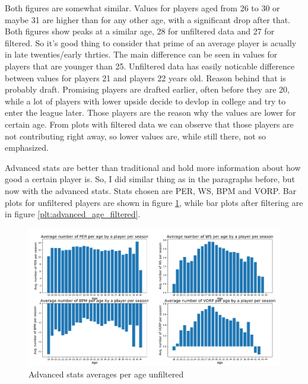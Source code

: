\documentclass[a4paper]{article}
\begin{document}
Both figures are somewhat similar. Values for players aged from 26 to 30 or maybe 31 are higher than for any other age, with a significant drop after that. Both figures show peaks at a similar age, 28 for unfiltered data and 27 for filtered. So it's good thing to consider that prime of an average player is acually in late twenties/early thrties. The main difference can be seen in values for players that are younger than 25. Unfiltered data has easily noticable difference between values for players 21 and players 22 years old. Reason behind that is probably draft. Promising players are drafted earlier, often before they are 20, while a lot of players with lower upside decide to devlop in college and try to enter the league later. Those players are the reason why the values are lower for certain age. From plots with filtered data we can observe that those players are not contributing right away, so lower values are, while still there, not so emphasized.

Advanced stats are better than traditional and hold more information about how good a certain player is. So, I did similar thing as in the paragraphs before, but now with the advanced stats. Stats chosen are PER, WS, BPM and VORP. Bar plots for unfiltered players are shown in figure \ref{plt:advanced_age}, while bar plots after filtering are in figure \ref{plt:advanced_age_filtered}.


\begin{figure}[h!]
\begin{center}
\includegraphics[scale=0.3]{advanced_stats_per_age.png}
\end{center}
\caption{Advanced stats averages per age unfiltered}
\label{plt:advanced_age}
\end{figure}
\end{document}

